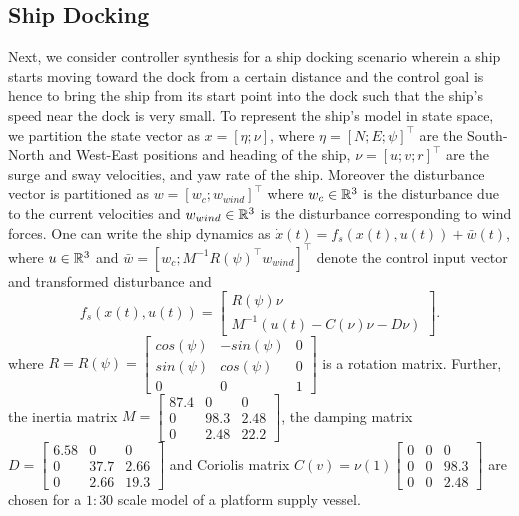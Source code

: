 \subsection{Ship Docking}\label{subsec:6dship}
Next, we consider controller synthesis for a ship docking scenario wherein a ship starts moving toward the dock from a certain distance and the control goal is hence to bring the ship from its start point into the dock such that the ship's speed near the dock is very small. To represent the ship's model in state space, we partition the state vector as $x=[\eta;\nu]$, where $\eta=[N;E;\psi]^\top$ are the South-North and West-East positions and heading of the ship, $\nu = [u ;v ;r]^\top$ are the surge and sway velocities, and yaw rate of the ship. Moreover the disturbance vector is partitioned as $w=[w_c;w_{wind}]^\top$ where $w_c\in\mathbb{R}^3$ is the disturbance due to the current velocities and $w_{wind}\in\mathbb{R}^3$ is the disturbance corresponding to wind forces. One can write the ship dynamics as $\dot x(t)=f_s(x(t),u(t))+\bar w(t)$, where $u\in\mathbb{R}^3$ and $\bar w=[w_c;M^{-1}R(\psi)^{\top}w_{wind}]^\top$ denote the control input vector and transformed disturbance and
\begin{equation}\label{eq:ship_ss}
f_{s}(x(t),u(t))=\begin{bmatrix}R(\psi)\nu\\M^{-1}(u(t)-C(\nu)\nu-D\nu)\end{bmatrix}.
\end{equation}
where $R=R(\psi)=\begin{bmatrix}
cos(\psi) &-sin(\psi) &0\\
sin(\psi) & cos(\psi) & 0\\
0 & 0 & 1
\end{bmatrix}$ is a rotation matrix. Further, the inertia matrix $M=\begin{bmatrix}
87.4 & 0 & 0 \\
0 & 98.3 & 2.48 \\
0 & 2.48 & 22.2
\end{bmatrix}$, the damping matrix $D=\begin{bmatrix}
6.58 & 0 & 0 \\
0 & 37.7 & 2.66 \\
0 & 2.66 & 19.3
\end{bmatrix}$ and Coriolis matrix $C(v)=\nu(1)\begin{bmatrix}
0 & 0 & 0 \\
0 & 0 & 98.3 \\
0 & 0 & 2.48
\end{bmatrix}$ are chosen for a $1:30$ scale model of a platform supply vessel.

